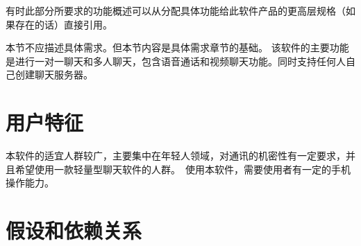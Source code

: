 有时此部分所要求的功能概述可以从分配具体功能给此软件产品的更高层规格（如果存在的话）直接引用。

本节不应描述具体需求。但本节内容是具体需求章节的基础。
\fi  %
该软件的主要功能是进行一对一聊天和多人聊天，包含语音通话和视频聊天功能。同时支持任何人自己创建聊天服务器。
\section{用户特征}
\iffalse  %
List down the basic required characteristics of the user or operator of the system. E.g. the experience, Skill level, required role etc., 
This part should not describe the specific requirements, instead, it provides the basis for the specific requirements.

列出对用户或系统操作者的要求，如：经验，能力，角色等。

本节不应描述具体需求。但本节内容是具体需求章节的基础。
\fi
本软件的适宜人群较广，主要集中在年轻人领域，对通讯的机密性有一定要求，并且希望使用一款轻量型聊天软件的人群。\
使用本软件，需要使用者有一定的手机操作能力。
\section{假设和依赖关系}
\iffalse  %
List any assumed factors (as opposed to known facts) that could affect the requirements stated in the SRS. These could include third party or commercial components that you plan to use, issues around the development or operating environment, or constraints. The project could be affected if these assumptions are incorrect, are not shared, or change. Also identify any dependencies the project has on external factors, such as software components that you intend to reuse from another project, unless they are already documented elsewhere (for example, in the vision and scope document or the project plan). 

列出可能影响SRS中需求的所有的假设因素（与已知事实相对而言），包括准备使用的第三方或商业组件，操作和开发环境的问题约束等。如果上述假设不正确、没有被告知或者改变了都将对项目产生影响。列出项目对外部条件的依赖，例如重用其他项目的模块等。如果在其他文档（例如项目计划或范围文档等）里已经描述了，在这里可以不用描述。
\fi